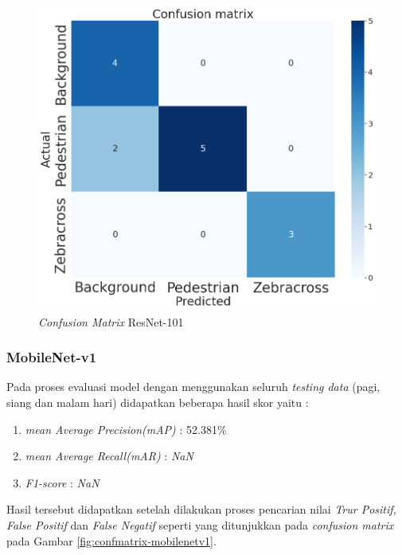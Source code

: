 \begin{figure}[H]
	\centering
	\includegraphics[scale=0.3]{gambar/confmatrix/resnet-101_confmat.png}
	\caption{\textit{Confusion Matrix} ResNet-101}
	\label{fig:confmatrix-resnet101}
\end{figure}

\subsubsection{MobileNet-v1}

Pada proses evaluasi model dengan menggunakan seluruh \textit{testing data} (pagi, siang dan malam hari) didapatkan beberapa hasil skor yaitu :
\begin{enumerate}[nolistsep]
	\item \textit{mean Average Precision(mAP)} : 52.381\%
	\item \textit{mean Average Recall(mAR)} : \textit{NaN}
	\item \textit{F1-score} : \textit{NaN}
\end{enumerate}
Hasil tersebut didapatkan setelah dilakukan proses pencarian nilai \textit{Trur Positif, False Positif} dan \textit{False Negatif} seperti yang ditunjukkan pada \textit{confusion matrix} pada Gambar \ref{fig:confmatrix-mobilenetv1}.

